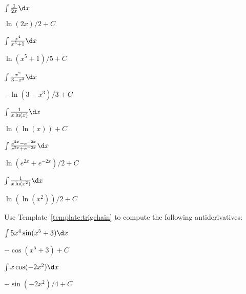\begin{exercises}
\begin{multicols}{2}
\begin{exercise}
$\int \frac{1}{2x} \d x$
\begin{answer}
$\ln(2x)/2 + C$
\end{answer}
\end{exercise}

\begin{exercise}
$\int \frac{x^4}{x^5+1} \d x$
\begin{answer}
$\ln(x^5+1)/5 +C$
\end{answer}
\end{exercise}

\begin{exercise}
$\int \frac{x^2}{3-x^3} \d x$  
\begin{answer}
$-\ln(3-x^3)/3+C$
\end{answer}
\end{exercise}

\columnbreak

\begin{exercise}
$\int \frac{1}{x\ln(x)} \d x$ 
\begin{answer}
$\ln(\ln(x))+C$
\end{answer}
\end{exercise}

\begin{exercise}
$\int \frac{e^{2x}-e^{-2x}}{e^{2x}+e^{-2x}} \d x$ 
\begin{answer}
$\ln(e^{2x}+e^{-2x})/2 +C$
\end{answer}
\end{exercise}

\begin{exercise}
$\int \frac{1}{x\ln(x^2)} \d x$ 
\begin{answer}
$\ln(\ln(x^2))/2 + C$
\end{answer}
\end{exercise}
\end{multicols}


\noindent Use Template~\ref{template:trigchain} to compute the
following antiderivatives:


\begin{multicols}{2}
\begin{exercise}
$\int 5x^4 \sin(x^5+3) \d x$ 
\begin{answer}
$-\cos(x^5+3) +C$
\end{answer}
\end{exercise}

\begin{exercise}
$\int x \cos(-2x^2) \d x$
\begin{answer}
$-\sin(-2x^2)/4 +C$
\end{answer}
\end{exercise}


\end{multicols}
\end{exercises}
